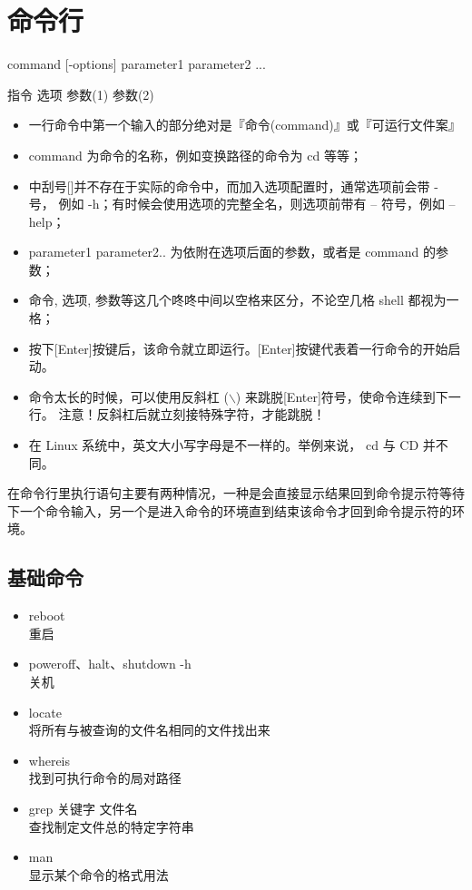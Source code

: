 \documentclass{article}
\begin{document}
\section{命令行}
command  [-options]  parameter1  parameter2 ...

指令 \qquad 选项  \qquad   参数(1) \qquad  参数(2)
\begin{itemize}
\item 一行命令中第一个输入的部分绝对是『命令(command)』或『可运行文件案』
\item command 为命令的名称，例如变换路径的命令为 cd 等等； 
\item 中刮号[]并不存在于实际的命令中，而加入选项配置时，通常选项前会带 - 号， 
    例如 -h；有时候会使用选项的完整全名，则选项前带有 -- 符号，例如 --help； 
\item parameter1 parameter2.. 为依附在选项后面的参数，或者是 command 的参数；  
\item 命令, 选项, 参数等这几个咚咚中间以空格来区分，不论空几格 shell 都视为一格；  
\item 按下[Enter]按键后，该命令就立即运行。[Enter]按键代表着一行命令的开始启动。 
\item 命令太长的时候，可以使用反斜杠 ($\backslash$) 来跳脱[Enter]符号，使命令连续到下一行。 
     注意！反斜杠后就立刻接特殊字符，才能跳脱！ 
\item  在 Linux 系统中，英文大小写字母是不一样的。举例来说， cd 与 CD 并不同。 
\end{itemize}
在命令行里执行语句主要有两种情况，一种是会直接显示结果回到命令提示符等待下一个命令输入，另一个是进入命令的环境直到结束该命令才回到命令提示符的环境。

\subsection{基础命令}
\begin{itemize}
\item reboot \\ 重启
\item poweroff、halt、shutdown -h \\关机
\item locate \\将所有与被查询的文件名相同的文件找出来
\item whereis \\找到可执行命令的局对路径
\item grep 关键字 文件名 \\查找制定文件总的特定字符串
\item man\\显示某个命令的格式用法
\end{itemize}
\end{document}
